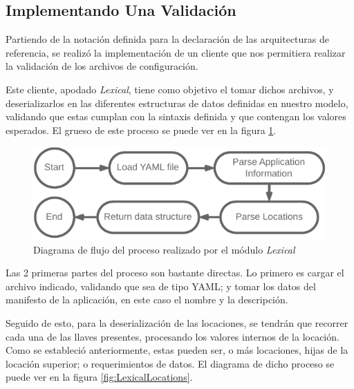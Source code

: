 \subsection{Implementando Una Validación} \label{sec:validation}


Partiendo de la notación definida para la declaración de las arquitecturas de referencia, se realizó la implementación de un cliente que nos permitiera realizar la validación de los archivos de configuración.

Este cliente, apodado \textit{Lexical}, tiene como objetivo el tomar dichos archivos, y deserializarlos en las diferentes estructuras de datos definidas en nuestro modelo, validando que estas cumplan con la sintaxis definida y que contengan los valores esperados. El grueso de este proceso se puede ver en la figura \ref*{fig:LexicalFlow}.

\begin{figure}[ht]
    \centering
    \caption{Diagrama de flujo del proceso realizado por el módulo \textit{Lexical}}
    \label{fig:LexicalFlow}
    \vspace{2mm}
    \includegraphics[width=0.75\linewidth]{images/LexicalFlow.pdf}
\end{figure}

Las 2 primeras partes del proceso son bastante directas. Lo primero es cargar el archivo indicado, validando que sea de tipo YAML; y tomar los datos del manifesto de la aplicación, en este caso el nombre y la descripción.

Seguido de esto, para la deserialización de las locaciones, se tendrán que recorrer cada una de las llaves presentes, procesando los valores internos de la locación. Como se estableció anteriormente, estas pueden ser, o más locaciones, hijas de la locación superior; o requerimientos de datos. El diagrama de dicho proceso se puede ver en la figura \ref{fig:LexicalLocations}.

